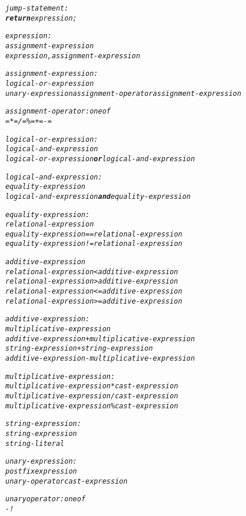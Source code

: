 \documentclass[12pt]{report}
\begin{document}
\begin{alltt}
     \textit{jump-statement:}
          \textit{\textbf{return} expression;}
          
     \textit{expression:}
          \textit{assignment-expression}
          \textit{expression , assignment-expression}
          
     \textit{assignment-expression:}
          \textit{logical-or-expression}
          \textit{unary-expression assignment-operator assignment-expression}
          
     \textit{assignment-operator: one of}
          \textit{=    *=    /=    \%=    +=    -=}
          
     \textit{logical-or-expression:}
          \textit{logical-and-expression}
          \textit{logical-or-expression \textbf{or} logical-and-expression}
          
     \textit{logical-and-expression:}
          \textit{equality-expression}
          \textit{logical-and-expression \textbf{and} equality-expression}
          
     \textit{equality-expression:}
          \textit{relational-expression}
          \textit{equality-expression == relational-expression}
          \textit{equality-expression != relational-expression}
          
     \textit{additive-expression}
          \textit{relational-expression < additive-expression}
          \textit{relational-expression > additive-expression}
          \textit{relational-expression <= additive-expression}
          \textit{relational-expression >= additive-expression}
          
     \textit{additive-expression:}
          \textit{multiplicative-expression}
          \textit{additive-expression + multiplicative-expression}
          \textit{string-expression + string-expression}
          \textit{additive-expression - multiplicative-expression}
          
     \textit{multiplicative-expression:}
          \textit{multiplicative-expression * cast-expression}
          \textit{multiplicative-expression / cast-expression}
          \textit{multiplicative-expression \% cast-expression}
          
     \textit{string-expression:}
          \textit{string-expression}
          \textit{string-literal}
          
     \textit{unary-expression:}
          \textit{postfix expression}
          \textit{unary-operator cast-expression}
          
     \textit{unary operator: one of}
          \textit{-    !}
          

\end{alltt}
\end{document}

